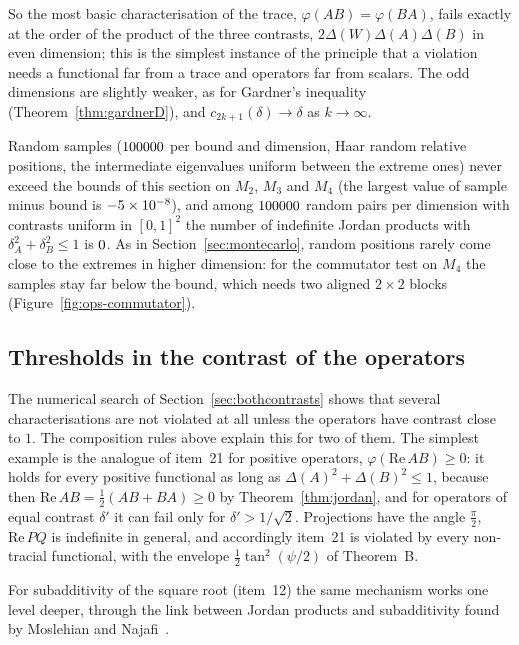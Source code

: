 \documentclass[11pt]{article}
\renewcommand{\Re}{\mathrm{Re}\,}
\theoremstyle{plain}
\theoremstyle{definition}
\theoremstyle{remark}
\begin{document}
So the most basic characterisation of the trace, $\varphi(AB)=\varphi(BA)$, fails exactly at the order of the product of
the three contrasts, $2\Delta(W)\Delta(A)\Delta(B)$ in even dimension; this is the simplest instance of the principle that a
violation needs a functional far from a trace and operators far from scalars. The odd dimensions are slightly weaker, as
for Gardner's inequality (Theorem~\ref{thm:gardnerD}), and $c_{2k+1}(\delta)\to\delta$ as $k\to\infty$.

Random samples ($100000$ per bound and dimension, Haar random relative positions, the intermediate eigenvalues
uniform between the extreme ones) never exceed the bounds of this section on $M_2$, $M_3$ and $M_4$ (the largest value of
sample minus bound is $-5\times10^{-8}$), and among $100000$ random pairs per dimension with contrasts uniform in $[0,1]^2$ the
number of indefinite Jordan products with $\delta_A^2+\delta_B^2\le1$ is $0$. As in
Section~\ref{sec:montecarlo}, random positions rarely come close to the extremes in higher dimension: for the commutator
test on $M_4$ the samples stay far below the bound, which needs two aligned $2\times2$ blocks
(Figure~\ref{fig:ops-commutator}).

\subsection{Thresholds in the contrast of the operators}\label{sec:thresholds}

The numerical search of Section~\ref{sec:bothcontrasts} shows that several characterisations are not violated at all
unless the operators have contrast close to $1$. The composition rules above explain this for two of them. The simplest
example is the analogue of item~21 for positive operators, $\varphi(\Re AB)\ge0$: it holds for every positive functional
as long as $\Delta(A)^2+\Delta(B)^2\le1$, because then $\Re AB=\frac12(AB+BA)\ge0$ by Theorem~\ref{thm:jordan}, and for
operators of equal contrast $\delta'$ it can fail only for $\delta'>1/\sqrt2$. Projections have the angle $\frac\pi2$,
$\Re PQ$ is indefinite in general, and accordingly item~21 is violated by every non-tracial functional, with the
envelope $\frac12\tan^2(\psi/2)$ of Theorem~B.

For subadditivity of the square root (item~12) the same mechanism works one level deeper, through the link between
Jordan products and subadditivity found by Moslehian and Najafi~\cite{moslehian2011}.
\end{document}
